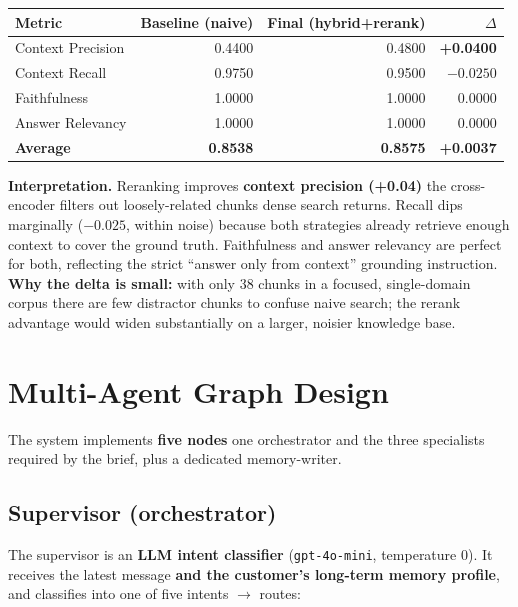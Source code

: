 \documentclass[11pt,a4paper]{article}
\newcommand{\code}[1]{\texttt{#1}}
\begin{document}
\begin{center}
\begin{tabular}{@{}lrrr@{}}
\toprule
\textbf{Metric} & \textbf{Baseline (naive)} & \textbf{Final (hybrid+rerank)} & \textbf{$\Delta$} \\
\midrule
Context Precision & 0.4400 & 0.4800 & \textbf{+0.0400} \\
Context Recall    & 0.9750 & 0.9500 & $-0.0250$ \\
Faithfulness      & 1.0000 & 1.0000 & 0.0000 \\
Answer Relevancy  & 1.0000 & 1.0000 & 0.0000 \\
\midrule
\textbf{Average}  & \textbf{0.8538} & \textbf{0.8575} & \textbf{+0.0037} \\
\bottomrule
\end{tabular}
\end{center}

\textbf{Interpretation.} Reranking improves \textbf{context precision (+0.04)} \textemdash{} the
cross-encoder filters out loosely-related chunks dense search returns. Recall dips marginally
($-0.025$, within noise) because both strategies already retrieve enough context to cover the
ground truth. Faithfulness and answer relevancy are perfect for both, reflecting the strict
``answer only from context'' grounding instruction. \textbf{Why the delta is small:} with only 38
chunks in a focused, single-domain corpus there are few distractor chunks to confuse naive search;
the rerank advantage would widen substantially on a larger, noisier knowledge base.

\section{Multi-Agent Graph Design}

The system implements \textbf{five nodes} \textemdash{} one orchestrator and the three specialists
required by the brief, plus a dedicated memory-writer.

\subsection{Supervisor (orchestrator)}
The supervisor is an \textbf{LLM intent classifier} (\code{gpt-4o-mini}, temperature 0). It receives
the latest message \textbf{and the customer's long-term memory profile}, and classifies into one of
five intents $\to$ routes:
\end{document}
